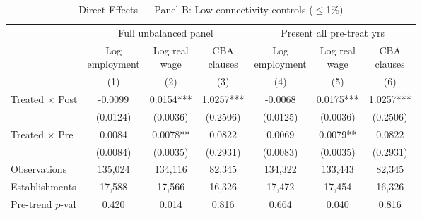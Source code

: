 \begin{table}[H]
\centering
\scriptsize
\caption{Direct Effects — Panel B: Low-connectivity controls ($\leq$1\%)}
\begin{tabular}{lcccccc}
\toprule
& \multicolumn{3}{c}{Full unbalanced panel} & \multicolumn{3}{c}{Present all pre-treat yrs} \\
\cmidrule(lr){2-4} \cmidrule(lr){5-7}
& \shortstack{Log\\employment} & \shortstack{Log real\\wage} & \shortstack{CBA\\clauses} & \shortstack{Log\\employment} & \shortstack{Log real\\wage} & \shortstack{CBA\\clauses} \\
& (1) & (2) & (3) & (4) & (5) & (6) \\
\midrule
Treated $\times$ Post & -0.0099 & 0.0154*** & 1.0257*** & -0.0068 & 0.0175*** & 1.0257*** \\
& (0.0124) & (0.0036) & (0.2506) & (0.0125) & (0.0036) & (0.2506) \\[3pt]
Treated $\times$ Pre & 0.0084 & 0.0078** & 0.0822 & 0.0069 & 0.0079** & 0.0822 \\
& (0.0084) & (0.0035) & (0.2931) & (0.0083) & (0.0035) & (0.2931) \\[3pt]
\midrule
Observations & 135,024 & 134,116 & 82,345 & 134,322 & 133,443 & 82,345 \\
Establishments & 17,588 & 17,566 & 16,326 & 17,472 & 17,454 & 16,326 \\
Pre-trend $p$-val & 0.420 & 0.014 & 0.816 & 0.664 & 0.040 & 0.816 \\
\bottomrule
\end{tabular}
\begin{minipage}{\textwidth}
\footnotesize
\medskip

\end{minipage}
\end{table}
